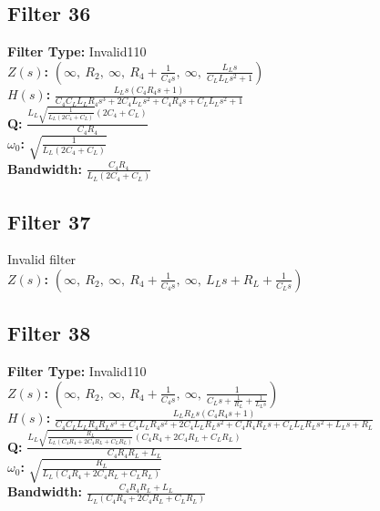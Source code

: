 \documentclass{article}
\begin{document}
\subsection*{Filter 36}
\textbf{Filter Type:} Invalid110 \\ 
\textbf{$Z(s)$:} $\left( \infty, \  R_{2}, \  \infty, \  R_{4} + \frac{1}{C_{4} s}, \  \infty, \  \frac{L_{L} s}{C_{L} L_{L} s^{2} + 1}\right)$ \\ 
\textbf{$H(s)$:} $\frac{L_{L} s \left(C_{4} R_{4} s + 1\right)}{C_{4} C_{L} L_{L} R_{4} s^{3} + 2 C_{4} L_{L} s^{2} + C_{4} R_{4} s + C_{L} L_{L} s^{2} + 1}$ \\ 
\textbf{Q:} $\frac{L_{L} \sqrt{\frac{1}{L_{L} \left(2 C_{4} + C_{L}\right)}} \left(2 C_{4} + C_{L}\right)}{C_{4} R_{4}}$ \\ 
\textbf{$\omega_0$:} $\sqrt{\frac{1}{L_{L} \left(2 C_{4} + C_{L}\right)}}$ \\ 
\textbf{Bandwidth:} $\frac{C_{4} R_{4}}{L_{L} \left(2 C_{4} + C_{L}\right)}$ \\ 
\subsection*{Filter 37}
Invalid filter \\ 
\textbf{$Z(s)$:} $\left( \infty, \  R_{2}, \  \infty, \  R_{4} + \frac{1}{C_{4} s}, \  \infty, \  L_{L} s + R_{L} + \frac{1}{C_{L} s}\right)$ \\ 
\subsection*{Filter 38}
\textbf{Filter Type:} Invalid110 \\ 
\textbf{$Z(s)$:} $\left( \infty, \  R_{2}, \  \infty, \  R_{4} + \frac{1}{C_{4} s}, \  \infty, \  \frac{1}{C_{L} s + \frac{1}{R_{L}} + \frac{1}{L_{L} s}}\right)$ \\ 
\textbf{$H(s)$:} $\frac{L_{L} R_{L} s \left(C_{4} R_{4} s + 1\right)}{C_{4} C_{L} L_{L} R_{4} R_{L} s^{3} + C_{4} L_{L} R_{4} s^{2} + 2 C_{4} L_{L} R_{L} s^{2} + C_{4} R_{4} R_{L} s + C_{L} L_{L} R_{L} s^{2} + L_{L} s + R_{L}}$ \\ 
\textbf{Q:} $\frac{L_{L} \sqrt{\frac{R_{L}}{L_{L} \left(C_{4} R_{4} + 2 C_{4} R_{L} + C_{L} R_{L}\right)}} \left(C_{4} R_{4} + 2 C_{4} R_{L} + C_{L} R_{L}\right)}{C_{4} R_{4} R_{L} + L_{L}}$ \\ 
\textbf{$\omega_0$:} $\sqrt{\frac{R_{L}}{L_{L} \left(C_{4} R_{4} + 2 C_{4} R_{L} + C_{L} R_{L}\right)}}$ \\ 
\textbf{Bandwidth:} $\frac{C_{4} R_{4} R_{L} + L_{L}}{L_{L} \left(C_{4} R_{4} + 2 C_{4} R_{L} + C_{L} R_{L}\right)}$ \\ 
\end{document}
